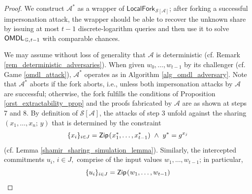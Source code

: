 \documentclass{iacrtrans}
\begin{document}
\begin{proof}
We construct $\mathcal{A}^*$ as a wrapper of
$
\mathsf{LocalFork}_{
		\hspace{1pt}
    	\mathcal{S}\hspace{0pt}[
    		\hspace{0pt}
    		\mathcal{A}
    		\hspace{0pt}
    	]
    }
$;
after forking a successful impersonation attack,
the wrapper should be able to recover the unknown share
by issuing at most $t-1$ discrete-logarithm queries
and then use it to solve
$\mathsf{OMDL}_{\hspace{1pt}\mathbb{G},\hspace{0.5pt} t-1}$
with comparable chances.

We may assume without loss of generality that $\mathcal{A}$
is deterministic (cf. Remark \ref{rem_deterministic_adversaries}).
When given $w_0, \dots, w_{t-1}$
by its challenger
(cf. Game \ref{omdl_attack}),
$\mathcal{A}^*$ operates as in Algorithm \ref{alg_omdl_adversary}.
Note that $\mathcal{A}^*$
aborts if the fork aborts,
i.e., unless both impersonation attacks by $\mathcal{A}$
are successful;
otherwise, the fork fulfills the conditions of
Proposition \ref{orst_extractability_prop}
and the proofs fabricated by $\mathcal{A}$
are as shown at steps 7 and 8.
By definition of
$\mathcal{S}\hspace{0pt}[
 	\hspace{0pt}
    \mathcal{A}
    \hspace{0pt}
    ]
$,
the attacks of step 3
unfold against the sharing $(x_1, \dots, x_n;\hspace{2pt} y)$
that is determined by the constraint
\vspace{5pt}
\begin{equation}\label{mt_1}
\{x_i\}_{i \in J} =
\mathsf{Zip}\hspace{0.75pt}
(\hspace{0.5pt}x_1^*, \dots, x_{t-1}^*)
\ \land
\ y^* = g ^ {x_j}
\vspace{5pt}
\end{equation}
(cf. Lemma \ref{shamir_sharing_simulation_lemma}).
Similarly, the intercepted commitments
$u_i,\hspace{2pt} i \in J,$
comprise of the input values $w_1, \dots, w_{t-1}$;
in particular,
\vspace{3pt}
\begin{equation}\label{mt_2}
\{u_i\}_{i \in J} =
\mathsf{Zip}\hspace{0.75pt}
(\hspace{0.5pt}w_1, \dots, w_{t-1})

\end{equation}
\end{proof}
\end{document}
